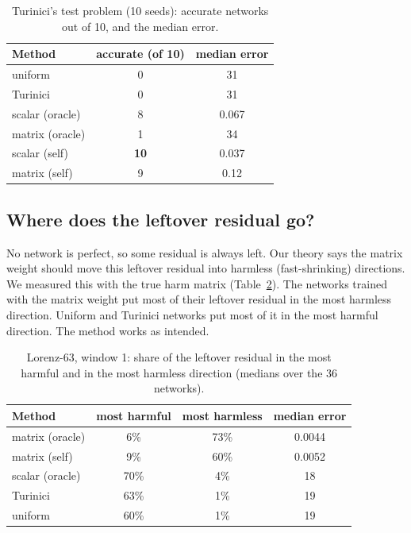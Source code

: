 \documentclass[11pt,a4paper]{article}
\begin{document}
\begin{table}[H]\centering
\caption{Turinici's test problem (10 seeds): accurate networks out of 10, and the median
error.}
\label{tab:bench}
\begin{tabular}{lcc}\toprule
Method & accurate (of 10) & median error\\\midrule
uniform & 0 & 31\\
Turinici & 0 & 31\\
scalar (oracle) & 8 & 0.067\\
matrix (oracle) & 1 & 34\\
scalar (self) & \textbf{10} & 0.037\\
matrix (self) & 9 & 0.12\\\bottomrule
\end{tabular}
\end{table}

\subsection{Where does the leftover residual go?}
No network is perfect, so some residual is always left. Our theory says the matrix weight
should move this leftover residual into harmless (fast-shrinking) directions. We measured
this with the true harm matrix (Table~\ref{tab:mech}). The networks trained with the matrix
weight put most of their leftover residual in the most harmless direction. Uniform and
Turinici networks put most of it in the most harmful direction. The method works as
intended.

\begin{table}[H]\centering
\caption{Lorenz-63, window 1: share of the leftover residual in the most harmful and in
the most harmless direction (medians over the 36 networks).}
\label{tab:mech}
\begin{tabular}{lccc}\toprule
Method & most harmful & most harmless & median error\\\midrule
matrix (oracle) & 6\% & 73\% & 0.0044\\
matrix (self) & 9\% & 60\% & 0.0052\\
scalar (oracle) & 70\% & 4\% & 18\\
Turinici & 63\% & 1\% & 19\\
uniform & 60\% & 1\% & 19\\\bottomrule
\end{tabular}
\end{table}

\end{document}
